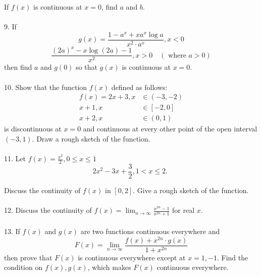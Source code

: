 If $f(x)$ is continuous at $x=0$, find $a$ and $b$.\\\\
9. If $$g(x)=\frac{1-a^x+x a^x \log a}{x^2 \cdot a^x}, x<0$$
$$
\frac{(2 a)^x-x \log (2 a)-1}{x^2}, x>0 \quad(\text { where } a>0)
$$
then find $a$ and $g(0)$ so that $g(x)$ is continuous at $x=0$.\\\\
10. Show that the function $f(x)$ defined as follows:
$$
\begin{aligned}
f(x)=2 x+3, x & \in(-3,-2) \\
x+1, x & \in[-2,0] \\
x+2, x & \in(0,1)
\end{aligned}
$$
is discontinuous at $x=0$ and continuous at every other point of the open interval $(-3,1)$. Draw a rough sketch of the function.\\\\
11. Let $f(x)=\frac{x^2}{2}, 0 \leq x \leq 1$
$$
2 x^2-3 x+\frac{3}{2}, 1<x \leq 2 \text {. }
$$

Discuss the continuity of $f(x)$ in $[0,2]$. Give a rough sketch of the function.\\\\
12. Discuss the continuity of $f(x)=\lim _{n \rightarrow \infty} \frac{x^{2 n}-1}{x^{2 n}+1}$ for real $x$.\\\\
13. If $f(x)$ and $g(x)$ are two functions continuous everywhere and
$$
F(x)=\lim _{n \rightarrow \infty} \frac{f(x)+x^{2 n} \cdot g(x)}{1+x^{2 n}}
$$
then prove that $F(x)$ is continuous everywhere except at $x=1,-1$. Find the condition on $f(x), g(x)$, which makes $F(x)$ continuous everywhere.\\\\

